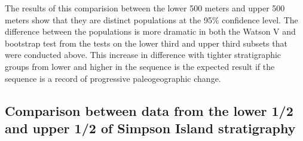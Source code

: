 \documentclass[letterpaper,10pt,english]{/Users/polarwander/Library/Enthought/Canopy_64bit/User/lib/python2.7/site-packages/sphinx/texinputs/sphinxhowto}
\begin{document}
        
    
The results of this comparision between the lower 500 meters and upper
500 meters show that they are distinct populations at the 95\%
confidence level. The difference between the populations is more
dramatic in both the Watson V and bootstrap test from the tests on the
lower third and upper third subsets that were conducted above. This
increase in difference with tighter stratigraphic groups from lower and
higher in the sequence is the expected result if the sequence is a
record of progressive paleogeographic change.\subsection{Comparison between data from the lower 1/2 and upper 1/2 of Simpson
Island stratigraphy}

\end{document}
